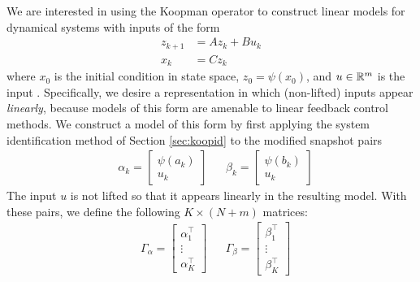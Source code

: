 We are interested in using the Koopman operator  to construct linear models for dynamical systems with inputs of the form 
\begin{equation}
\begin{aligned}
    z_{k+1} &= A z_k + B u_k \\
    x_k &= C z_k
    \label{eq:linSys}
\end{aligned}
\end{equation}
where $x_0$ is the initial condition in state space, $z_0 = \psi(x_0)$, and $u \in \mathbb{R}^m$ is the input .
Specifically, we desire a representation in which (non-lifted) inputs appear \emph{linearly}, because models of this form are amenable to linear feedback control methods.
We construct a model of this form by first applying the system identification method of Section \ref{sec:koopid} to the modified snapshot pairs 
\begin{align}
    &\alpha_k = \begin{bmatrix} \psi(a_k) \\ u_k \end{bmatrix} 
    &&\beta_k = \begin{bmatrix} \psi(b_k) \\ u_k \end{bmatrix} 
\end{align}
The input $u$ is not lifted so that it appears linearly in the resulting model.
With these pairs, we define the following ${K \times (N + m)}$ matrices:
\begin{align}
    &\Gamma_\alpha = \begin{bmatrix} \alpha_1^\top \\ \vdots \\  \alpha_K^\top \end{bmatrix}
    &&\Gamma_\beta = \begin{bmatrix} \beta_1^\top \\ \vdots \\  \beta_K^\top \end{bmatrix}
    \label{eq:Gamma}
\end{align}

